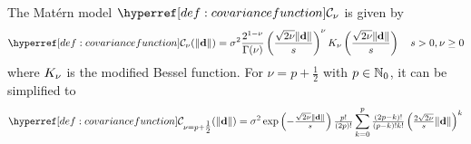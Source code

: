 
\begin{definition}
	The Matérn model \(\C_\nu\) is given by
	\[
		\C_\nu(\|\step\|)
		= \sigma^2 \frac{2^{1-\nu}}{\Gamma(\nu)}
		\left(\frac{\sqrt{2\nu}\|\step\|}{\scale}\right)^\nu
		\modifiedBessel\left(\frac{\sqrt{2\nu}\|\step\|}{\scale}\right)
		\quad \scale >0, \nu \ge 0
	\]
	where \(K_\nu\) is the modified Bessel function. For \(\nu=p+\frac12\)
	with \(p\in\mathbb{N}_0\), it can be simplified \parencite[cf.][sec.
	4.2.1]{williamsGaussianProcessesMachine2006} to
	\[
		\C_{\nu=p+\tfrac12}(\|\step\|)
		= \sigma^2 \exp\left(- \tfrac{\sqrt{2\nu} \|\step\|}{s}\right)\tfrac{p!}{(2p)!}
		\sum_{k=0}^p \tfrac{(2p-k)!}{(p-k)!k!}\left(\tfrac{2\sqrt{2\nu}}{s}\|\step\|\right)^k
		\nonumber
	\]
\end{definition}
